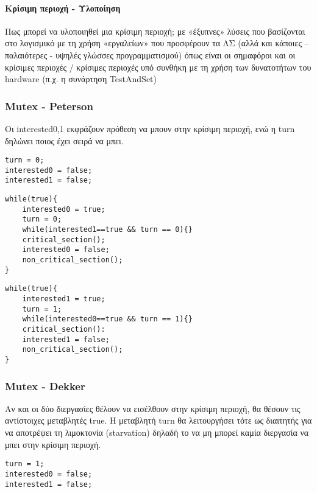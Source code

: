 \paragraph{Κρίσιμη περιοχή - Υλοποίηση}

\indent Πως μπορεί να υλοποιηθεί μια κρίσιμη περιοχή;
με «έξυπνες» λύσεις που βασίζονται στο λογισμικό
με τη χρήση «εργαλείων» που προσφέρουν τα ΛΣ
(αλλά και κάποιες – παλαιότερες - υψηλές γλώσσες
προγραμματισμού) όπως είναι οι σημαφόροι και οι
κρίσιμες περιοχές / κρίσιμες περιοχές υπό συνθήκη
με τη χρήση των δυνατοτήτων του hardware (π.χ. η
συνάρτηση TestAndSet)

\subsubsection{Mutex - Peterson}

Οι interested0,1 εκφράζουν πρόθεση να μπουν στην κρίσιμη περιοχή, 
ενώ η turn δηλώνει ποιος έχει σειρά να μπει.


\begin{lstlisting}[caption=Init Values]
turn = 0;
interested0 = false;
interested1 = false;
\end{lstlisting}

\begin{lstlisting}[caption=Process P0]
while(true){
	interested0 = true;
	turn = 0;
	while(interested1==true && turn == 0){}
	critical_section();
	interested0 = false;
	non_critical_section();
}
\end{lstlisting}

\begin{lstlisting}[caption=Process P1]
while(true){
	interested1 = true;
	turn = 1;
	while(interested0==true && turn == 1){}
	critical_section():
	interested1 = false;
	non_critical_section();
}
\end{lstlisting}

\subsubsection{Mutex - Dekker}

Αν και οι δύο διεργασίες θέλουν να
εισέλθουν στην κρίσιμη περιοχή, θα
θέσουν τις αντίστοιχες μεταβλητές true.
Η μεταβλητή turn θα λειτουργήσει τότε ως
διαιτητής για να αποτρέψει τη λιμοκτονία
(starvation) δηλαδή το να μη μπορεί καμία
διεργασία να μπει στην κρίσιμη περιοχή.

\begin{lstlisting}[caption=Init values]
turn = 1;
interested0 = false;
interested1 = false;
\end{lstlisting}

